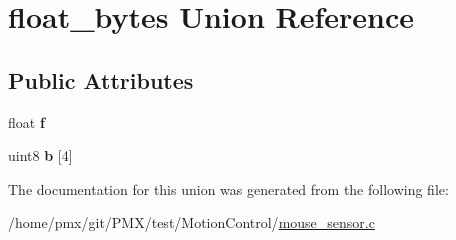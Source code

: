 \hypertarget{unionfloat__bytes}{}\section{float\+\_\+bytes Union Reference}
\label{unionfloat__bytes}
\subsection*{Public Attributes}
\begin{DoxyCompactItemize}
\item 
\mbox{\label{unionfloat__bytes_a0e42c681264b341f4d91b291a09f1f20}} 
float {\bfseries f}
\item 
\mbox{\label{unionfloat__bytes_a8dfc7b40376fc71879b7a06c5da201a4}} 
uint8 {\bfseries b} \mbox{[}4\mbox{]}
\end{DoxyCompactItemize}


The documentation for this union was generated from the following file\+:\begin{DoxyCompactItemize}
\item 
/home/pmx/git/\+P\+M\+X/test/\+Motion\+Control/\hyperlink{mouse__sensor_8c}{mouse\+\_\+sensor.\+c}\end{DoxyCompactItemize}
